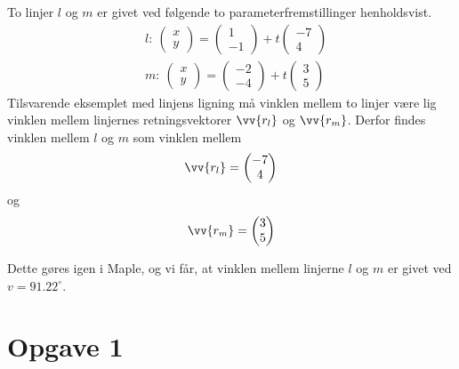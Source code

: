 \begin{exa}
	To linjer $l$ og $m$ er givet ved følgende to parameterfremstillinger henholdsvist.
	\begin{align*}
		&l: \ 
		\begin{pmatrix}
			x \\ y
		\end{pmatrix} = 
		\begin{pmatrix}
			1 \\ -1
		\end{pmatrix} + t
		\begin{pmatrix}
			-7 \\ 4
		\end{pmatrix}
		\\
		&m: \ 
		\begin{pmatrix}
			x \\ y
		\end{pmatrix} =
		\begin{pmatrix}
			-2 \\ -4
		\end{pmatrix} + t
		\begin{pmatrix}
			3 \\ 5
		\end{pmatrix}
	\end{align*}
	Tilsvarende eksemplet med linjens ligning må vinklen mellem to linjer være lig vinklen
	mellem linjernes retningsvektorer $\vv{r_l}$ og $\vv{r_m}$. Derfor findes vinklen mellem
	$l$ og $m$ som vinklen mellem 
	\begin{align*}
		\vv{r_l} = 
		\begin{pmatrix}
			-7 \\ 4
		\end{pmatrix}\\
	\end{align*}
	og 
	\begin{align*}
		\vv{r_m} = 
		\begin{pmatrix}
			3 \\ 5
		\end{pmatrix}
	\end{align*}
	
	Dette gøres igen i Maple, og vi får, at vinklen mellem linjerne $l$ og $m$ er givet ved
	$v = 91.22^{\circ}$. 
\end{exa}

\section*{Opgave 1}

